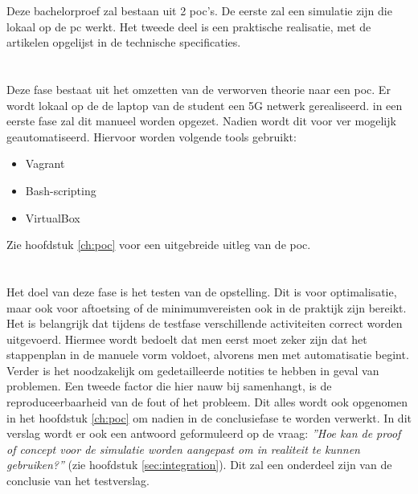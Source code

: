 Deze bachelorproef zal bestaan uit 2 \gls{poc}'s. De eerste zal een simulatie zijn die lokaal op de pc werkt. Het tweede deel is een praktische realisatie, met de artikelen opgelijst in de technische specificaties.

\section{}%
\label{sec:poc1}%
Deze fase bestaat uit het omzetten van de verworven theorie naar een \gls{poc}. Er wordt lokaal op de de laptop van de student een 5G netwerk gerealiseerd. in een eerste fase zal dit manueel worden opgezet. Nadien wordt dit voor ver mogelijk geautomatiseerd. Hiervoor worden volgende tools gebruikt:

\begin{itemize}
    \item Vagrant
    \item Bash-scripting
    \item VirtualBox
\end{itemize}

Zie hoofdstuk \ref{ch:poc} voor een uitgebreide uitleg van de \gls{poc}.


\section{}
\label{sec:use}
Het doel van deze fase is het testen van de opstelling. Dit is voor optimalisatie, maar ook voor aftoetsing of de minimumvereisten ook in de praktijk zijn bereikt. Het is belangrijk dat tijdens de testfase verschillende activiteiten correct worden uitgevoerd. Hiermee wordt bedoelt dat men eerst moet zeker zijn dat het stappenplan in de manuele vorm voldoet, alvorens men met automatisatie begint. Verder is het noodzakelijk om gedetailleerde notities te hebben in geval van problemen. Een tweede factor die hier nauw bij samenhangt, is de reproduceerbaarheid van de fout of het probleem.  Dit alles wordt ook opgenomen in het hoofdstuk \ref{ch:poc} om nadien in de conclusiefase te worden verwerkt. In dit verslag wordt er ook een antwoord geformuleerd op de vraag: \textit{''Hoe kan de proof of concept voor de simulatie worden aangepast om in realiteit te kunnen gebruiken?''} (zie hoofdstuk \ref{sec:integration}). Dit zal een onderdeel zijn van de conclusie van het testverslag.
